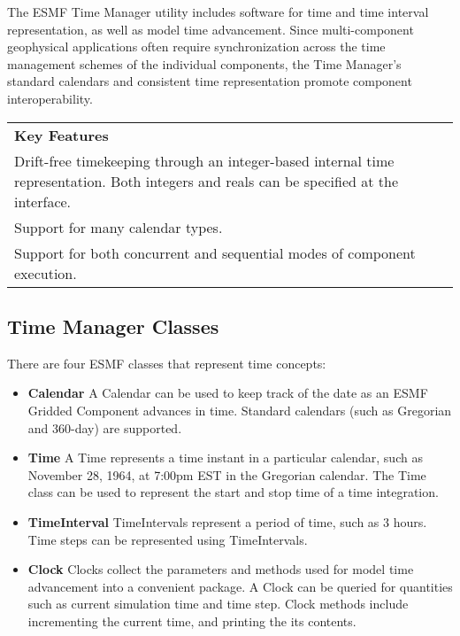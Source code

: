 
The ESMF Time Manager utility includes software for time and time interval 
representation, as well as model time advancement. Since multi-component 
geophysical applications often require synchronization across 
the time management schemes of the individual components, the 
Time Manager's standard calendars and consistent time representation 
promote component interoperability.
\begin{center}  
\begin{tabular}{|p{6in}|}
\hline
\vspace{.01in}
{\bf Key Features} \\[.01in]
Drift-free timekeeping through an integer-based internal time 
representation.  Both integers and reals can be specified at the interface. \\
Support for many calendar types. \\
Support for both concurrent and sequential modes of component execution. \\[.03in] \hline
\end{tabular}
\end{center}

\subsection{Time Manager Classes}
There are four ESMF classes that represent time concepts:
\begin{itemize}
\item {\bf Calendar}  A Calendar can be used to keep track of the 
date as an ESMF Gridded Component advances in time. Standard calendars 
(such as Gregorian and 360-day) are supported. 
\item {\bf Time} A Time represents a time instant in a particular 
calendar, such as November 28, 1964, at 7:00pm EST in the Gregorian 
calendar.  The Time class can be used 
to represent the start and stop time of a time integration.
\item {\bf TimeInterval} TimeIntervals represent a period 
of time, such as 3 hours.  Time steps can be represented 
using TimeIntervals. 
\item {\bf Clock} Clocks collect the parameters and 
methods used for model time advancement into a convenient 
package.  A Clock can be queried for quantities such 
as current simulation time and time step.  Clock methods 
include incrementing the current time, and printing the its contents.
\end{itemize}


